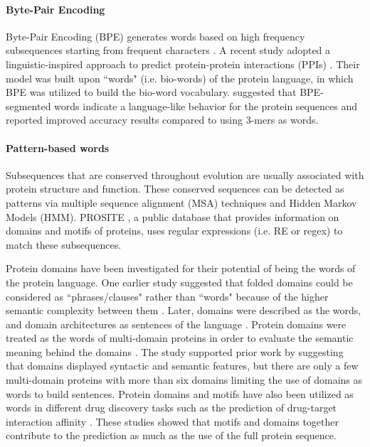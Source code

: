 \documentclass[review]{elsarticle}
\begin{document}
\paragraph{Byte-Pair Encoding} 

Byte-Pair Encoding (BPE) generates words based on high frequency subsequences starting from frequent characters \cite{sennrich2015neural}. A recent study  adopted a linguistic-inspired approach to predict protein-protein interactions (PPIs) \cite{wang2019high}.  Their model was built upon ``words" (i.e. bio-words) of the protein language, in which BPE was utilized to build the bio-word vocabulary. \citet{wang2019high} suggested that BPE-segmented words indicate a language-like behavior for the protein sequences and reported improved accuracy results compared to using $3$-mers as words. %

\paragraph{Pattern-based words}  Subsequences that are conserved throughout evolution are usually associated with protein structure and function. These conserved sequences can be detected as patterns via multiple sequence alignment (MSA) techniques and Hidden Markov Models (HMM). PROSITE \cite{hulo2006prosite}, a public database that provides information on domains and motifs of proteins, uses regular expressions (i.e. RE or regex) to match these subsequences. 

Protein domains have been investigated for their potential of being the words of the protein language. One earlier study suggested that folded domains could be considered as ``phrases/clauses" rather than ``words" because of the higher semantic complexity between them \cite{gimona2006protein}. Later, domains were described as the words, and domain architectures as sentences of the language \cite{scaiewicz2015language, yu2019grammar}. 
Protein domains were treated as the words of multi-domain proteins in order to evaluate the semantic meaning behind the domains \cite{buchan2019inferring}. The study supported  prior work by \citet{yu2019grammar} suggesting that domains displayed syntactic and semantic features, but there are only a few multi-domain proteins with more than six domains limiting the use of domains as words to build sentences. Protein domains and motifs have also been utilized as words in different drug discovery tasks such as the prediction of drug-target interaction affinity \cite{greenside2017prediction, ozturk2019widedta}. These studies showed that motifs and domains together contribute to the prediction as much as the use of the full protein sequence. 
\end{document}
